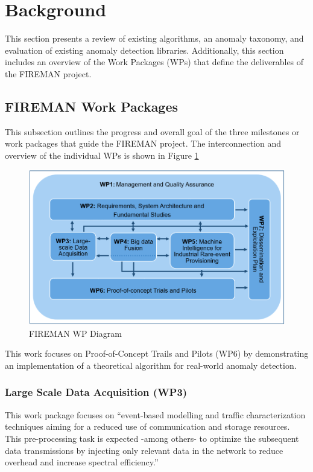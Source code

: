 \section{Background}
This section presents a review of existing algorithms, an anomaly taxonomy, and evaluation of existing anomaly detection libraries. Additionally, this section includes an overview of the Work Packages (WPs) that define the deliverables of the FIREMAN project.

\subsection{FIREMAN Work Packages}
\label{ref_FIREMAN_WP}

This subsection outlines the progress and overall goal of the three milestones or work packages that guide the FIREMAN project. The interconnection and overview of the individual WPs is shown in Figure \ref{fig:wp-diagram}

\begin{figure}[H]
    \includegraphics[width=\textwidth]{Images/FIREMAN_pert_diagram.png}
    \caption{FIREMAN WP Diagram \parencite{fireman-homepage}}
    \label{fig:wp-diagram}
\end{figure}

This work focuses on Proof-of-Concept Trails and Pilots (WP6) by demonstrating an implementation of a theoretical algorithm for real-world anomaly detection.

\subsubsection{Large Scale Data Acquisition (WP3)}

This work package focuses on \enquote{event-based modelling and traffic characterization techniques aiming for a reduced use of communication and storage resources. This pre-processing task is expected -among others- to optimize the subsequent data transmissions by injecting only relevant data in the network to reduce overhead and increase spectral efficiency.} 

